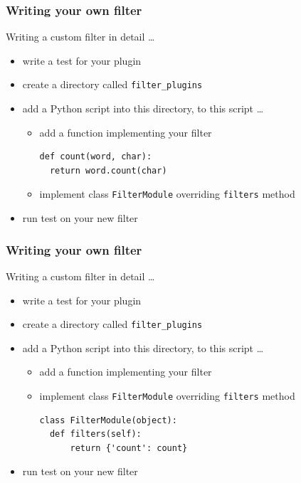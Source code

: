 \documentclass[pdf]{beamer}
\begin{document}
\begin{frame}[t,fragile]
  \frametitle{Writing your own filter}
  Writing a custom filter in detail \ldots
  \begin{itemize}
    \item {write a test for your plugin}
    \item {create a directory called \texttt{filter\_plugins}}
    \item {add a Python script into this directory, to this script \ldots}
      \begin{itemize}
        \item \alert {add a function implementing your filter}
          \begin{lstlisting}
def count(word, char):
  return word.count(char)
          \end{lstlisting}
        \item {implement class \texttt{FilterModule} overriding \texttt{filters} method}
      \end{itemize}
    \item {run test on your new filter}
  \end{itemize}
\end{frame}

\begin{frame}[t,fragile]
  \frametitle{Writing your own filter}
  Writing a custom filter in detail \ldots
  \begin{itemize}
    \item {write a test for your plugin}
    \item {create a directory called \texttt{filter\_plugins}}
    \item {add a Python script into this directory, to this script \ldots}
      \begin{itemize}
        \item {add a function implementing your filter}
        \item \alert {implement class \texttt{FilterModule} overriding \texttt{filters} method}
          \begin{lstlisting}
class FilterModule(object):
  def filters(self):
      return {'count': count}
          \end{lstlisting}
      \end{itemize}
    \item {run test on your new filter}
  \end{itemize}
\end{frame}
\end{document}
